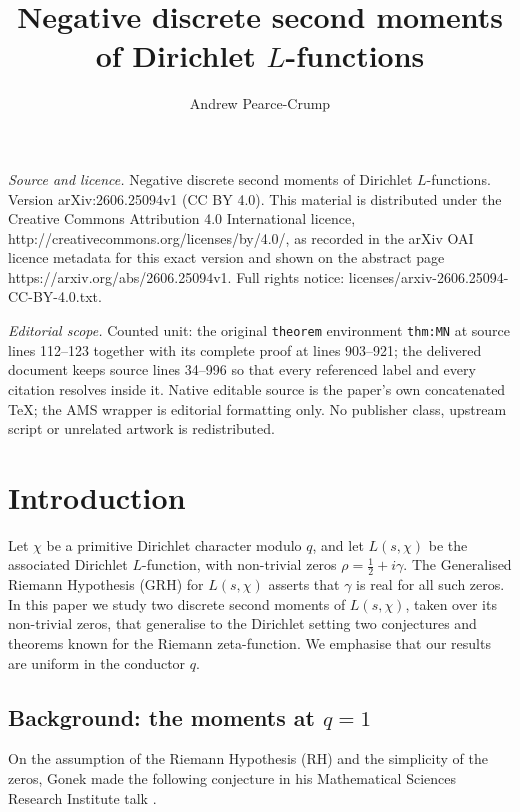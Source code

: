 \documentclass[10pt,a4paper]{amsart}
\numberwithin{equation}{section}
\begin{document}
\title[Negative discrete second moments of Dirichlet L-functions]{Negative discrete second moments of Dirichlet $L$-functions}
\author{Andrew Pearce-Crump}
\date{}
\maketitle
\noindent\emph{Source and licence.} Negative discrete second moments of Dirichlet $L$-functions. Version arXiv:2606.25094v1 (CC BY 4.0). This material is distributed under the Creative Commons Attribution 4.0 International licence, http://creativecommons.org/licenses/by/4.0/, as recorded in the arXiv OAI licence metadata for this exact version and shown on the abstract page https://arxiv.org/abs/2606.25094v1. Full rights notice: licenses/arxiv-2606.25094-CC-BY-4.0.txt.\par\smallskip
\noindent\textit{Editorial scope.} Counted unit: the original \texttt{theorem} environment \texttt{thm:MN} at source lines 112--123 together with its complete proof at lines 903--921; the delivered document keeps source lines 34--996 so that every referenced label and every citation resolves inside it. Native editable source is the paper's own concatenated TeX; the AMS wrapper is editorial formatting only. No publisher class, upstream script or unrelated artwork is redistributed.
\section{Introduction}\label{sect:intro}

Let $\chi$ be a primitive Dirichlet character modulo $q$, and let $L(s,\chi)$ be the associated Dirichlet $L$-function, with non-trivial zeros $\rho=\tfrac12+i\gamma$. The Generalised Riemann Hypothesis (GRH) for $L(s,\chi)$ asserts that $\gamma$ is real for all such zeros. In this paper we study two discrete second moments of $L(s,\chi)$, taken over its non-trivial zeros, that generalise to the Dirichlet setting two conjectures and theorems known for the Riemann zeta-function. We emphasise that our results are uniform in the conductor $q$.

\subsection{Background: the moments at $q=1$}
On the assumption of the Riemann Hypothesis (RH) and the simplicity of the zeros, Gonek made the following conjecture in his Mathematical Sciences Research Institute talk \cite{Gonek}.
\end{document}

